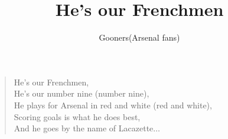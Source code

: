 \documentclass[a4paper,12pt]{article}
\title{He's our Frenchmen}
\author{Gooners(Arsenal fans)}
\date{}
\begin{document}
	
	\maketitle
	
	\begin{verse}
		
		He's our Frenchmen, \\
		He's our number nine (number nine), \\
		He plays for Arsenal in red and white (red and white), \\
		Scoring goals is what he does best, \\
		And he goes by the name of Lacazette$\ldots$
		
	\end{verse}
	
\end{document}
